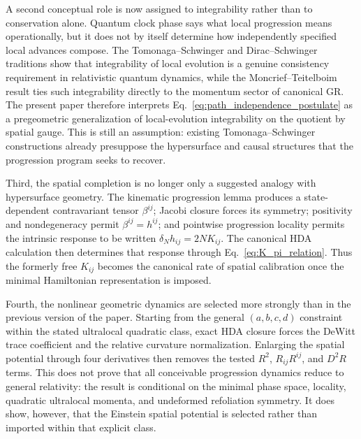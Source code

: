 \documentclass[11pt]{article}
\begin{document}
A second conceptual role is now assigned to integrability rather than to conservation alone. Quantum clock phase says what local progression means operationally, but it does not by itself determine how independently specified local advances compose. The Tomonaga--Schwinger and Dirac--Schwinger traditions show that integrability of local evolution is a genuine consistency requirement in relativistic quantum dynamics, while the Moncrief--Teitelboim result ties such integrability directly to the momentum sector of canonical GR. The present paper therefore interprets Eq.~\eqref{eq:path_independence_postulate} as a pregeometric generalization of local-evolution integrability on the quotient by spatial gauge. This is still an assumption: existing Tomonaga--Schwinger constructions already presuppose the hypersurface and causal structures that the progression program seeks to recover.

Third, the spatial completion is no longer only a suggested analogy with hypersurface geometry. The kinematic progression lemma produces a state-dependent contravariant tensor $\beta^{ij}$; Jacobi closure forces its symmetry; positivity and nondegeneracy permit $\beta^{ij}=h^{ij}$; and pointwise progression locality permits the intrinsic response to be written $\delta_Nh_{ij}=2NK_{ij}$. The canonical HDA calculation then determines that response through Eq.~\eqref{eq:K_pi_relation}. Thus the formerly free $K_{ij}$ becomes the canonical rate of spatial calibration once the minimal Hamiltonian representation is imposed.

Fourth, the nonlinear geometric dynamics are selected more strongly than in the previous version of the paper. Starting from the general $(a,b,c,d)$ constraint within the stated ultralocal quadratic class, exact HDA closure forces the DeWitt trace coefficient and the relative curvature normalization. Enlarging the spatial potential through four derivatives then removes the tested $R^2$, $R_{ij}R^{ij}$, and $D^2R$ terms. This does not prove that all conceivable progression dynamics reduce to general relativity: the result is conditional on the minimal phase space, locality, quadratic ultralocal momenta, and undeformed refoliation symmetry. It does show, however, that the Einstein spatial potential is selected rather than imported within that explicit class.
\end{document}
